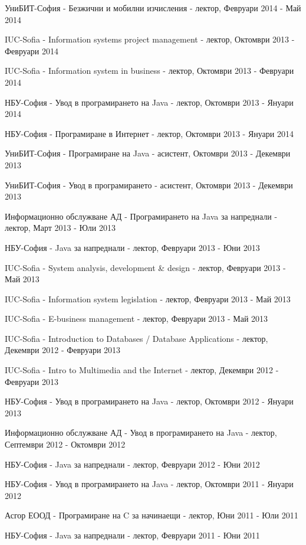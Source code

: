\documentclass[bulgarian,a4paper]{europasscv}
\begin{document}
\begin{europasscv}
{\begin{ecvitemize}
    \item УниБИТ-София - Безжични и мобилни изчисления - лектор, Февруари 2014 - Май 2014
    \item IUC-Sofia - Information systems project management - лектор, Октомври 2013 - Февруари 2014
    \item IUC-Sofia - Information system in business - лектор, Октомври 2013 - Февруари 2014
    \item НБУ-София - Увод в програмирането на Java - лектор, Октомври 2013 - Януари 2014
    \item НБУ-София - Програмиране в Интернет - лектор, Октомври 2013 - Януари 2014
    \item УниБИТ-София - Програмиране на Java - асистент, Октомври 2013 - Декември 2013
    \item УниБИТ-София - Увод в програмирането - асистент, Октомври 2013 - Декември 2013
    \item Информационно обслужване АД - Програмирането на Java за напреднали - лектор, Март 2013 - Юли 2013
    \item НБУ-София - Java за напреднали - лектор, Февруари 2013 - Юни 2013
    \item IUC-Sofia - System analysis, development \& design - лектор, Февруари 2013 - Май 2013
    \item IUC-Sofia - Information system legislation - лектор, Февруари 2013 - Май 2013
    \item IUC-Sofia - E-business management - лектор, Февруари 2013 - Май 2013
    \item IUC-Sofia - Introduction to Databases / Database Applications - лектор, Декември 2012 - Февруари 2013
    \item IUC-Sofia - Intro to Multimedia and the Internet - лектор, Декември 2012 - Февруари 2013
    \item НБУ-София - Увод в програмирането на Java - лектор, Октомври 2012 - Януари 2013
    \item Информационно обслужване АД - Увод в програмирането на Java - лектор, Септември 2012 - Октомври 2012
    \item НБУ-София - Java за напреднали - лектор, Февруари 2012 - Юни 2012
    \item НБУ-София - Увод в програмирането на Java - лектор, Октомври 2011 - Януари 2012
    \item Асгор ЕООД - Програмиране на C за начинаещи - лектор, Юни 2011 - Юли 2011
    \item НБУ-София - Java за напреднали - лектор, Февруари 2011 - Юни 2011

\end{ecvitemize}}
\end{europasscv}
\end{document}
